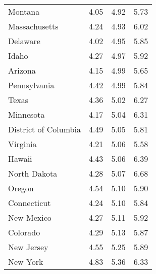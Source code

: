 \begin{tabular}{lrrr}
Montana & 4.05 & 4.92 & 5.73 \\
Massachusetts & 4.24 & 4.93 & 6.02 \\
Delaware & 4.02 & 4.95 & 5.85 \\
Idaho & 4.27 & 4.97 & 5.92 \\
Arizona & 4.15 & 4.99 & 5.65 \\
Pennsylvania & 4.42 & 4.99 & 5.84 \\
Texas & 4.36 & 5.02 & 6.27 \\
Minnesota & 4.17 & 5.04 & 6.31 \\
District of Columbia & 4.49 & 5.05 & 5.81 \\
Virginia & 4.21 & 5.06 & 5.58 \\
Hawaii & 4.43 & 5.06 & 6.39 \\
North Dakota & 4.28 & 5.07 & 6.68 \\
Oregon & 4.54 & 5.10 & 5.90 \\
Connecticut & 4.24 & 5.10 & 5.84 \\
New Mexico & 4.27 & 5.11 & 5.92 \\
Colorado & 4.29 & 5.13 & 5.87 \\
New Jersey & 4.55 & 5.25 & 5.89 \\
New York & 4.83 & 5.36 & 6.33 \\
\bottomrule
\end{tabular}
